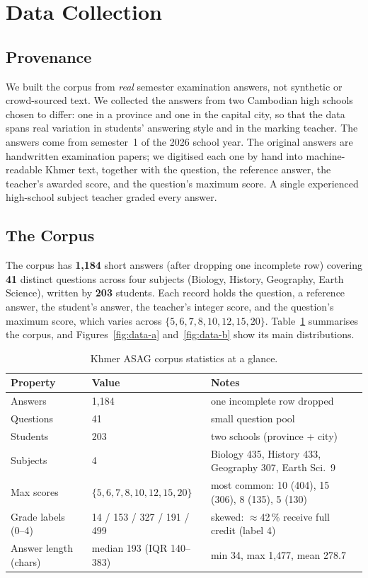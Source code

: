 \section{Data Collection}
\label{sec:data}

\subsection{Provenance}
We built the corpus from \emph{real} semester examination answers, not synthetic or crowd-sourced
text. We collected the answers from two Cambodian high schools chosen to differ: one in a province and
one in the capital city, so that the data spans real variation in students' answering style and in the
marking teacher. The answers come from semester~1 of the 2026 school year. The original answers are
handwritten examination papers; we digitised each one by hand into machine-readable Khmer text,
together with the question, the reference answer, the teacher's awarded score, and the question's
maximum score. A single experienced high-school subject teacher graded every answer.

\subsection{The Corpus}
The corpus has \textbf{1{,}184} short answers (after dropping one incomplete row) covering \textbf{41}
distinct questions across four subjects (Biology, History, Geography, Earth Science), written by
\textbf{203} students. Each record holds the question, a reference answer, the student's answer, the
teacher's integer score, and the question's maximum score, which varies across
$\{5,6,7,8,10,12,15,20\}$. Table~\ref{tab:descriptive} summarises the corpus, and
Figures~\ref{fig:data-a} and~\ref{fig:data-b} show its main distributions.

\begin{table}[t]
\centering
\caption{Khmer ASAG corpus statistics at a glance.}
\label{tab:descriptive}
\small
\begin{tabular}{@{}ll>{\raggedright\arraybackslash}p{6cm}@{}}
\toprule
Property & Value & Notes \\
\midrule
Answers              & 1{,}184                       & one incomplete row dropped \\
Questions            & 41                            & small question pool \\
Students             & 203                           & two schools (province + city) \\
Subjects             & 4                             & Biology 435, History 433, Geography 307, Earth Sci.\ 9 \\
Max scores           & $\{5,6,7,8,10,12,15,20\}$     & most common: 10 (404), 15 (306), 8 (135), 5 (130) \\
Grade labels (0--4)  & 14 / 153 / 327 / 191 / 499    & skewed: $\approx$42\,\% receive full credit (label 4) \\
Answer length (chars)& median 193 (IQR 140--383)     & min 34, max 1{,}477, mean 278.7 \\
\bottomrule
\end{tabular}
\end{table}

